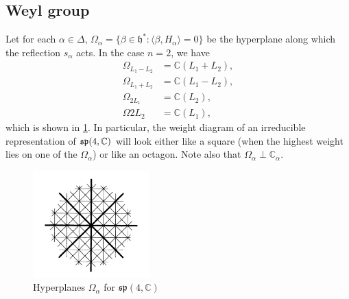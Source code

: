 \documentclass{report}
\begin{document}
\subsection{Weyl group}
Let for each $\alpha \in \Delta$, $\Omega_\alpha = \{ \beta \in \mathfrak h^* : \langle \beta, H_\alpha \rangle = 0 \}$ be the hyperplane along which the reflection $s_\alpha$ acts.
In the case $n = 2$, we have 
\begin{align*}
    \Omega_{L_1 - L_2} &= \mathbb C (L_1 + L_2),\\
    \Omega_{L_1 + L_2} &= \mathbb C (L_1 - L_2),\\
    \Omega_{2L_1} &= \mathbb C (L_2),\\
    \Omega{2L_2} &= \mathbb C (L_1),
\end{align*}
which is shown in \cref{fig:root_hyperplanes_sp_4_C}. In particular, the weight diagram of an irreducible representation of $\operatorname{{\mathfrak{sp}}}(4, \mathbb C)$ will look either like a square (when the highest weight lies on one of the $\Omega_\alpha$) or like an octagon.
Note also that $\Omega_\alpha \perp \mathbb C_\alpha$.
\begin{figure}[h]
    \centering
    \includegraphics[width=0.4\textwidth]{root_hyperplanes_sp_4_C.png}
    \caption{Hyperplanes $\Omega_\alpha$ for $\mathfrak{sp}(4, \mathbb C)$}
    \label{fig:root_hyperplanes_sp_4_C}
\end{figure}
\end{document}
